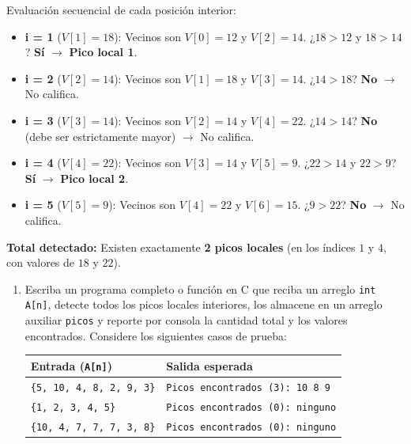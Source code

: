 \documentclass[11pt,letterpaper]{article}
\begin{document}
\begin{enumerate}[label=\textbf{\arabic*.}]
\begin{enumerate}[label=(\alph*)]
\begin{solucionbox}
        \noindent Evaluación secuencial de cada posición interior:
        \begin{itemize}[noitemsep]
            \item \textbf{i = 1} ($V[1] = 18$): Vecinos son $V[0]=12$ y $V[2]=14$. ¿$18 > 12$ y $18 > 14$? \textbf{Sí} $\rightarrow$ \textbf{Pico local 1}.
            \item \textbf{i = 2} ($V[2] = 14$): Vecinos son $V[1]=18$ y $V[3]=14$. ¿$14 > 18$? \textbf{No} $\rightarrow$ No califica.
            \item \textbf{i = 3} ($V[3] = 14$): Vecinos son $V[2]=14$ y $V[4]=22$. ¿$14 > 14$? \textbf{No} (debe ser estrictamente mayor) $\rightarrow$ No califica.
            \item \textbf{i = 4} ($V[4] = 22$): Vecinos son $V[3]=14$ y $V[5]=9$. ¿$22 > 14$ y $22 > 9$? \textbf{Sí} $\rightarrow$ \textbf{Pico local 2}.
            \item \textbf{i = 5} ($V[5] = 9$): Vecinos son $V[4]=22$ y $V[6]=15$. ¿$9 > 22$? \textbf{No} $\rightarrow$ No califica.
        \end{itemize}
        \textbf{Total detectado:} Existen exactamente \textbf{2 picos locales} (en los índices $1$ y $4$, con valores de $18$ y $22$).
        \end{solucionbox}
    \end{enumerate}

    \newpage
    \begin{enumerate}[label=(\alph*), resume]
        \item Escriba un programa completo o función en C que reciba un arreglo \texttt{int A[n]}, detecte todos los picos locales interiores, los almacene en un arreglo auxiliar \texttt{picos} y reporte por consola la cantidad total y los valores encontrados. Considere los siguientes casos de prueba:
        
        \begin{center}
        \begin{tabular}{ll}
        \toprule
        \textbf{Entrada (\texttt{A[n]})} & \textbf{Salida esperada} \\
        \midrule
        \texttt{\{5, 10, 4, 8, 2, 9, 3\}} & \texttt{Picos encontrados (3): 10 8 9} \\
        \texttt{\{1, 2, 3, 4, 5\}} & \texttt{Picos encontrados (0): ninguno} \\
        \texttt{\{10, 4, 7, 7, 7, 3, 8\}} & \texttt{Picos encontrados (0): ninguno} \\
        \bottomrule
        \end{tabular}
        \end{center}


\end{enumerate}
\end{enumerate}
\end{document}
